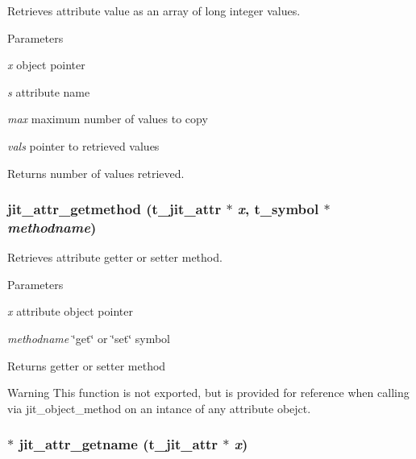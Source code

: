 Retrieves attribute value as an array of long integer values. 
\begin{DoxyParams}{Parameters}
\item[{\em x}]object pointer \item[{\em s}]attribute name \item[{\em max}]maximum number of values to copy \item[{\em vals}]pointer to retrieved values\end{DoxyParams}
\begin{DoxyReturn}{Returns}
number of values retrieved. 
\end{DoxyReturn}
\hypertarget{group__attrmod_gadbc0727e253f6307bda9ac0becd132a9}{
\subsubsection[{jit\_\-attr\_\-getmethod}]{ jit\_\-attr\_\-getmethod ({\bf t\_\-jit\_\-attr} $\ast$ {\em x}, \/  {\bf t\_\-symbol} $\ast$ {\em methodname})}}
\label{group__attrmod_gadbc0727e253f6307bda9ac0becd132a9}


Retrieves attribute getter or setter method. 
\begin{DoxyParams}{Parameters}
\item[{\em x}]attribute object pointer \item[{\em methodname}]\char`\"{}get\char`\"{} or \char`\"{}set\char`\"{} symbol\end{DoxyParams}
\begin{DoxyReturn}{Returns}
getter or setter method
\end{DoxyReturn}
\begin{DoxyWarning}{Warning}
This function is not exported, but is provided for reference when calling via jit\_\-object\_\-method on an intance of any attribute obejct. 
\end{DoxyWarning}
\hypertarget{group__attrmod_ga0c557da38fc8b2d94ca1de983e7ad603}{
\subsubsection[{jit\_\-attr\_\-getname}]{ $\ast$ jit\_\-attr\_\-getname ({\bf t\_\-jit\_\-attr} $\ast$ {\em x})}}
\label{group__attrmod_ga0c557da38fc8b2d94ca1de983e7ad603}


